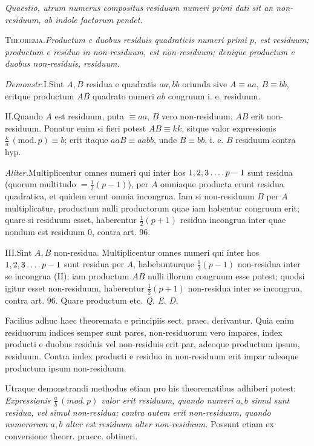 \begin{center}\small\emph{Quaestio, utrum numerus compositus residuum numeri primi dati sit an non-residuum, ab indole factorum pendet.}\end{center}

\textsc{Theorema.}\quad \emph{Productum e duobus residuis quadraticis numeri primi $p$, est residuum; productum e residuo in non-residuum, est non-residuum; denique productum e duobus non-residuis, residuum.}

\emph{Demonstr.}\quad I.\quad Sint $A,B$ residua e quadratis $aa,bb$ oriunda sive $A\equiv aa$, $B\equiv bb$, eritque productum $AB$ quadrato numeri $ab$ congruum i. e. residuum.

II.\quad Quando $A$ est residuum, puta $\equiv aa$, $B$ vero non-residuum, $AB$ erit non-residuum. Ponatur enim si fieri potest $AB\equiv kk$, sitque valor expressionis $\frac{k}{a}\,(\mathrm{mod.}\,p)\equiv b$; erit itaque $aaB\equiv aabb$, unde $B\equiv bb$, i. e. $B$ residuum contra hyp.

\emph{Aliter.}\quad Multiplicentur omnes numeri qui inter hos $1,2,3\mathinner{\ldotp\ldotp\ldotp\ldotp} p-1$ sunt residua (quorum multitudo $=\tfrac12(p-1)$), per $A$ omniaque producta erunt residua quadratica, et quidem erunt omnia incongrua. Iam si non-residuum $B$ per $A$ multiplicatur, productum nulli productorum quae iam habentur congruum erit; quare si residuum esset, haberentur $\tfrac12(p+1)$ residua incongrua inter quae nondum est residuum $0$, contra art. 96.

III.\quad Sint $A,B$ non-residua. Multiplicentur omnes numeri qui inter hos $1,2,3\mathinner{\ldotp\ldotp\ldotp\ldotp} p-1$ sunt residua per $A$, habebunturque $\tfrac12(p-1)$ non-residua inter se incongrua (II); iam productum $AB$ nulli illorum congruum esse potest; quodsi igitur esset non-residuum, haberentur $\tfrac12(p+1)$ non-residua inter se incongrua, contra art. 96. Quare productum etc. \emph{Q. E. D.}

Facilius adhuc haec theoremata e principiis sect. praec. derivantur. Quia enim residuorum indices semper sunt pares, non-residuorum vero impares, index producti e duobus residuis vel non-residuis erit par, adeoque productum ipsum, residuum. Contra index producti e residuo in non-residuum erit impar adeoque productum ipsum non-residuum.

Utraque demonstrandi methodus etiam pro his theorematibus adhiberi potest: \emph{Expressionis $\frac{a}{b}\,(\mathit{mod.}\,p)$ valor erit residuum, quando numeri $a,b$ simul sunt residua, vel simul non-residua; contra autem erit non-residuum, quando numerorum $a,b$ alter est residuum alter non-residuum.} Possunt etiam ex conversione theorr. praecc. obtineri.

